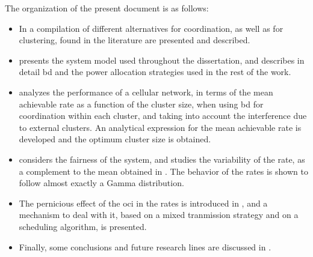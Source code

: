 The organization of the present document is as follows:

\begin{itemize}
    \item In  a compilation of different alternatives for
        coordination, as well as for clustering, found in the literature are
        presented and described.
    \item {} presents the system model used throughout the
        dissertation, and describes in detail \gls{bd} and the power allocation
        strategies used in the rest of the work.
    \item {} analyzes the performance of a cellular network,
        in terms of the mean achievable rate as a function of the cluster size,
        when using \gls{bd} for coordination within each cluster, and taking
        into account the interference due to external clusters. An analytical
        expression for the mean achievable rate is developed and the optimum
        cluster size is obtained.
    \item {} considers the fairness of the system, and
        studies the variability of the rate, as a complement to the mean
        obtained in . The behavior of the rates is shown
        to follow almost exactly a Gamma distribution.
    \item The pernicious effect of the \gls{oci} in the rates is introduced in
        , and a mechanism to deal with it, based on
        a mixed tranmission strategy and on a scheduling algorithm, is
        presented.
    \item Finally, some conclusions and future research lines are discussed in
        .
\end{itemize}
